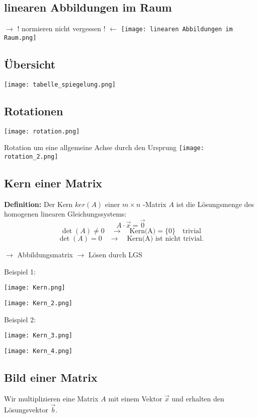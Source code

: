\begin{multicols*}{3}
    \subsection{ linearen Abbildungen im Raum}
    {$\rightarrow $ $!$ normieren nicht vergessen $!$ $\leftarrow$}
    {\texttt{[image: linearen Abbildungen im Raum.png]}}
    \vfill\null
    \columnbreak

    \subsection{ Übersicht}
    {\texttt{[image: tabelle\_spiegelung.png]}}

    \subsection{ Rotationen}

    {\texttt{[image: rotation.png]}}

    {Rotation um eine allgemeine Achse durch den Ursprung}
    {\texttt{[image: rotation\_2.png]}}
    \vfill\null
    \columnbreak
    \subsection{ Kern einer Matrix}
    {\textbf{Definition:} Der Kern $ker(A)$ einer $m\times n$ -Matrix $A$ ist die Lösungsmenge des homogenen linearen
        Gleichungssystems: $$A\cdot \vec{x} = \vec{0}$$}
    {$$\det(A) \neq 0 \quad \rightarrow \quad \text{Kern(A)}=\{0\} \quad \text{trivial}$$}
    {$$\det(A)=0 \quad \rightarrow \quad \text{Kern(A) ist nicht trivial}.$$}

    {$\rightarrow$ Abbildungsmatrix  $\rightarrow$ Lösen durch LGS}

    {Beispiel 1:}

    {\texttt{[image: Kern.png]}}

    {\texttt{[image: Kern\_2.png]}}



    {Beispiel 2:}

    {\texttt{[image: Kern\_3.png]}}

    {\texttt{[image: Kern\_4.png]}}
    \vfill\null
    \columnbreak
    \subsection{ Bild einer Matrix}
    {Wir multiplizieren eine Matrix $A$  mit einem Vektor $\vec{x}$
        und erhalten den Lösungsvektor $\vec{b}$.}


\end{multicols*}

